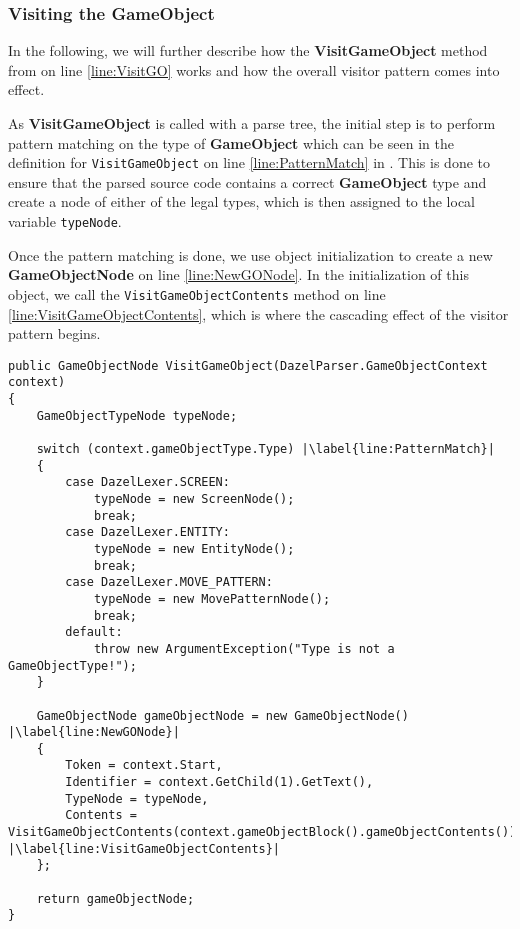 \subsubsection*{Visiting the GameObject}
In the following, we will further describe how the \textbf{VisitGameObject} method from  on line \ref{line:VisitGO} works and how the overall visitor pattern comes into effect.

As \textbf{VisitGameObject} is called with a parse tree, the initial step is to perform pattern matching on the type of \textbf{GameObject} which can be seen in the definition for \texttt{VisitGameObject} on line \ref{line:PatternMatch} in . This is done to ensure that the parsed source code contains a correct \textbf{GameObject} type and create a node of either of the legal types, which is then assigned to the local variable \texttt{typeNode}.

Once the pattern matching is done, we use object initialization to create a new \textbf{GameObjectNode} on line \ref{line:NewGONode}. In the initialization of this object, we call the \texttt{VisitGameObjectContents} method on line \ref{line:VisitGameObjectContents}, which is where the cascading effect of the visitor pattern begins. 

\begin{lstlisting}[language=CSharp, caption={The initial stage of visiting}, label={lst:VisitParseTree},escapechar=|]
public GameObjectNode VisitGameObject(DazelParser.GameObjectContext context)
{
    GameObjectTypeNode typeNode;
    
    switch (context.gameObjectType.Type) |\label{line:PatternMatch}|
    {
        case DazelLexer.SCREEN:
            typeNode = new ScreenNode();
            break;
        case DazelLexer.ENTITY:
            typeNode = new EntityNode();
            break;
        case DazelLexer.MOVE_PATTERN:
            typeNode = new MovePatternNode();
            break;
        default:
            throw new ArgumentException("Type is not a GameObjectType!");
    }

    GameObjectNode gameObjectNode = new GameObjectNode() |\label{line:NewGONode}|
    {
        Token = context.Start,
        Identifier = context.GetChild(1).GetText(),
        TypeNode = typeNode,
        Contents = VisitGameObjectContents(context.gameObjectBlock().gameObjectContents()) |\label{line:VisitGameObjectContents}|
    };
    
    return gameObjectNode;
}
\end{lstlisting}


